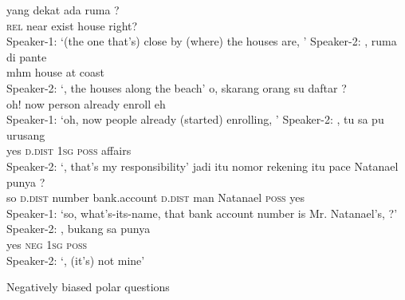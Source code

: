 \ea
\label{Example_13.31}
\ea
\label{Example_13.31a}
 {yang} {dekat} {ada} {ruma} {?}\\ %
 {}    \textsc{rel}  near  exist  house  right?\\
 Speaker-1: ‘(the one that’s) close by (where) the houses are, ’
\vspace{10pt}
\ex
\label{Example_13.31b}
\gll    Speaker-2:  ,  ruma  di  pante\\
 {}    mhm  house  at  coast\\
\glt Speaker-2: ‘, the houses along the beach’ \textstyleExampleSource{[080917-009-CvEx.0012-0013]}
\vspace{10pt}
\z
\z
\ea
\label{Example_13.32}
\ea
\label{Example_13.32a}
 {o,} {skarang} {orang} {su} {daftar} {?}\\ %
 {}   oh!  now  person  already  enroll  eh\\
 Speaker-1: ‘oh, now people already (started) enrolling, ’
\vspace{10pt}
\ex
\label{Example_13.32b}
\gll    Speaker-2:  ,  tu  sa  pu  urusang\\
 {}    yes  \textsc{d.dist}  \textsc{1sg}  \textsc{poss}  affairs\\
\glt Speaker-2: ‘, that’s my responsibility’ \textstyleExampleSource{[081005-001-Cv.0031-0032]}
\z
\z
\ea
\label{Example_13.33}
\ea
\label{Example_13.33a}
 {jadi} {{itu}} {{nomor}} {{rekening}} {itu}  {pace}  {Natanael} {punya}  {?}\\ %
 {}      so  {\textsc{d.dist}}  {number}  {bank.account}  \textsc{d.dist}  {man}  {Natanael} {\textsc{poss}}  {yes}\\
\glt Speaker-1: ‘so, what’s-its-name, that bank account number is Mr. Natanael’s, ?’
\vspace{10pt}
\ex
\label{Example_13.33b}
\gll    Speaker-2:  ,  bukang  sa  punya\\
 {}   yes  \textsc{neg}  \textsc{1sg}  \textsc{poss}\\
\glt Speaker-2: ‘, (it’s) not mine’ \textstyleExampleSource{[080922-001a-CvPh.0078-0079]}
\z
\z

\begin{styleExampleTitle}
Negatively biased polar questions
\end{styleExampleTitle}

